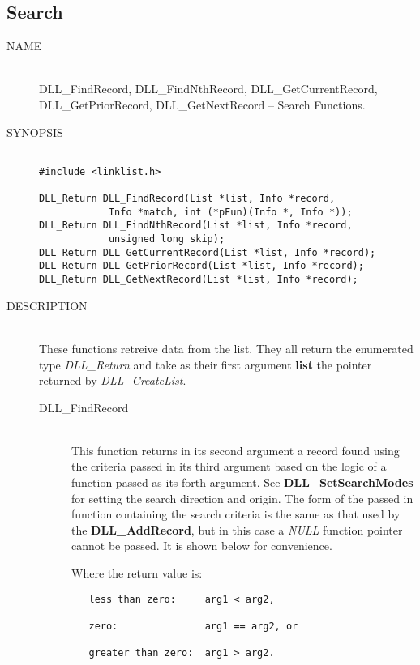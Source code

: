 \documentclass[10pt,letterpaper,titlepage]{article}
\begin{document}
\subsection{Search}
\begin{description}
\item[NAME]\quad\\
DLL\_FindRecord, DLL\_FindNthRecord, DLL\_GetCurrentRecord,\\
DLL\_GetPriorRecord, DLL\_GetNextRecord -- Search Functions.

\item[SYNOPSIS]
\begin{verbatim}

#include <linklist.h>

DLL_Return DLL_FindRecord(List *list, Info *record,
            Info *match, int (*pFun)(Info *, Info *));
DLL_Return DLL_FindNthRecord(List *list, Info *record,
            unsigned long skip);
DLL_Return DLL_GetCurrentRecord(List *list, Info *record);
DLL_Return DLL_GetPriorRecord(List *list, Info *record);
DLL_Return DLL_GetNextRecord(List *list, Info *record);
\end{verbatim}

\item[DESCRIPTION]\quad\\
These functions retreive data from the list.  They all return the enumerated type \emph{DLL\_Return} and take as their first argument \textbf{list} the pointer returned by \emph{DLL\_CreateList}.

 \begin{description}
 \item[DLL\_FindRecord]\quad\\
 This function returns in its second argument a record found using the criteria passed in its third argument based on the logic of a function passed as its forth argument.  See \textbf{DLL\_SetSearchModes} for setting the search direction and origin.  The form of the passed in function containing the search criteria is the same as that used by the \textbf{DLL\_AddRecord}, but in this case a \emph{NULL} function pointer cannot be passed.  It is shown below for convenience.
 \vspace{8pt}

 Where the return value is:
 \begin{verbatim}
   less than zero:     arg1 < arg2,

   zero:               arg1 == arg2, or

   greater than zero:  arg1 > arg2.
 \end{verbatim}


\end{description}
\end{description}
\end{document}
